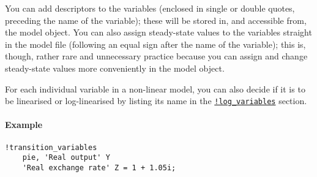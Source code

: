 You can add descriptors to the variables (enclosed in single or double
quotes, preceding the name of the variable); these will be stored in,
and accessible from, the model object. You can also assign steady-state
values to the variables straight in the model file (following an equal
sign after the name of the variable); this is, though, rather rare and
unnecessary practice because you can assign and change steady-state
values more conveniently in the model object.

For each individual variable in a non-linear model, you can also decide
if it is to be linearised or log-linearised by listing its name in the
\href{modellang/logvariables}{\texttt{!log\_variables}} section.

\paragraph{Example}\label{example}

\begin{verbatim}
!transition_variables
    pie, 'Real output' Y
    'Real exchange rate' Z = 1 + 1.05i;
\end{verbatim}


